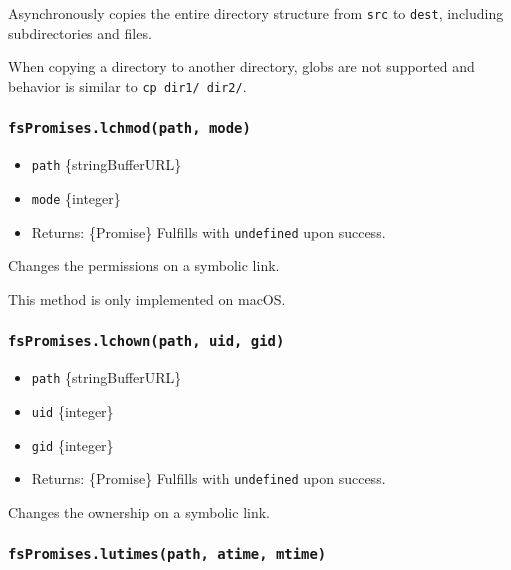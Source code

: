 Asynchronously copies the entire directory structure from \texttt{src}
to \texttt{dest}, including subdirectories and files.

When copying a directory to another directory, globs are not supported
and behavior is similar to \texttt{cp\ dir1/\ dir2/}.

\subsubsection{\texorpdfstring{\texttt{fsPromises.lchmod(path,\ mode)}}{fsPromises.lchmod(path, mode)}}\label{fspromises.lchmodpath-mode}

\begin{itemize}
\tightlist
\item
  \texttt{path} \{string\textbar Buffer\textbar URL\}
\item
  \texttt{mode} \{integer\}
\item
  Returns: \{Promise\} Fulfills with \texttt{undefined} upon success.
\end{itemize}

Changes the permissions on a symbolic link.

This method is only implemented on macOS.

\subsubsection{\texorpdfstring{\texttt{fsPromises.lchown(path,\ uid,\ gid)}}{fsPromises.lchown(path, uid, gid)}}\label{fspromises.lchownpath-uid-gid}

\begin{itemize}
\tightlist
\item
  \texttt{path} \{string\textbar Buffer\textbar URL\}
\item
  \texttt{uid} \{integer\}
\item
  \texttt{gid} \{integer\}
\item
  Returns: \{Promise\} Fulfills with \texttt{undefined} upon success.
\end{itemize}

Changes the ownership on a symbolic link.

\subsubsection{\texorpdfstring{\texttt{fsPromises.lutimes(path,\ atime,\ mtime)}}{fsPromises.lutimes(path, atime, mtime)}}\label{fspromises.lutimespath-atime-mtime}

